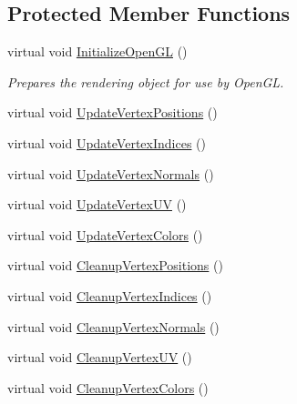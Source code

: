 \subsection*{Protected Member Functions}
\begin{DoxyCompactItemize}
\item 
virtual void \hyperlink{class_rendering_object_a77c78d1b42ea2ebfdbf994b6b91ce805}{Initialize\+Open\+G\+L} ()
\begin{DoxyCompactList}\small\item\em Prepares the rendering object for use by Open\+G\+L. \end{DoxyCompactList}\item 
virtual void \hyperlink{class_rendering_object_a7a097727acf37f9671ddd5e3a9873771}{Update\+Vertex\+Positions} ()
\item 
virtual void \hyperlink{class_rendering_object_afb49054121b1b552bce58625db91b851}{Update\+Vertex\+Indices} ()
\item 
virtual void \hyperlink{class_rendering_object_ae4b537e1c9b1c5c50cb7b0db83e6f190}{Update\+Vertex\+Normals} ()
\item 
virtual void \hyperlink{class_rendering_object_ac00889f2afaa605b09164649ef68a1b6}{Update\+Vertex\+U\+V} ()
\item 
virtual void \hyperlink{class_rendering_object_aca18dbb9252f27cef09df307dbcf02a9}{Update\+Vertex\+Colors} ()
\item 
virtual void \hyperlink{class_rendering_object_af9c1a07398071cdd0cca3ad36095fc85}{Cleanup\+Vertex\+Positions} ()
\item 
virtual void \hyperlink{class_rendering_object_ac60c8a7f3d5678fd4aa8198f6c980e6e}{Cleanup\+Vertex\+Indices} ()
\item 
virtual void \hyperlink{class_rendering_object_ad89bc24893f8fe32794f0686c2bb0da1}{Cleanup\+Vertex\+Normals} ()
\item 
virtual void \hyperlink{class_rendering_object_a776f54b41f9e9f0e55fc1104919c3e7c}{Cleanup\+Vertex\+U\+V} ()
\item 
virtual void \hyperlink{class_rendering_object_adce4a6d6406eb589b088bedd19127f32}{Cleanup\+Vertex\+Colors} ()
\end{DoxyCompactItemize}
